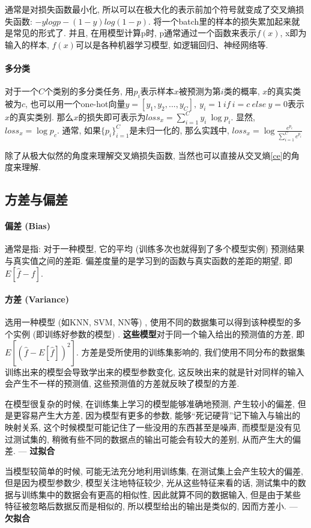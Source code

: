 通常是对损失函数最小化, 所以可以在极大化的表示前加个符号就变成了交叉熵损失函数: $- y log p - (1-y) log(1-p)$. 将一个batch里的样本的损失累加起来就是常见的形式了. 并且, 在用模型计算p时, p通常通过一个函数来表示$f(x)$, x即为输入的样本, $f(x)$可以是各种机器学习模型, 如逻辑回归、神经网络等. 


\paragraph{多分类}
对于一个$C$个类别的多分类任务, 用$p_i$表示样本$x$被预测为第$i$类的概率, $x$的真实类被为$c$, 也可以用一个one-hot向量$y = [y_1, y_2, ..., y_C],\ y_i = 1\ if\ i = c\ else\ y = 0$表示$x$的真实类别. 那么$x$的损失即可表示为$loss_x = \sum_{i=1}^C y_i\ \log p_i$. 显然, $loss_x = \log p_c$. 通常, 如果$\{p_i\}_{i=1}^C$是未归一化的, 那么实践中, $loss_x = \log \frac{e^{p_c}}{\sum_{i=1}^C e^{p_i}}$

除了从极大似然的角度来理解交叉熵损失函数, 当然也可以直接从交叉熵\ref{ce}的角度来理解. 

\subsection{方差与偏差}
\paragraph{偏差 (Bias) }通常是指: 对于一种模型, 它的平均 (训练多次也就得到了多个模型实例) 预测结果与真实值之间的差距. 偏差度量的是学习到的函数与真实函数的差距的期望, 即$E[\hat{f} - f]$. 

\paragraph{方差 (Variance) }选用一种模型 (如KNN, SVM, NN等) , 使用不同的数据集可以得到该种模型的多个实例 (即训练好参数的模型) . \textbf{这些模型}对于同一个输入给出的预测值的方差, 即$E[(\hat{f} - E[\hat{f}])^2]$. 方差是受所使用的训练集影响的, 我们使用不同分布的数据集训练出来的模型会导致学出来的模型参数变化, 这反映出来的就是针对同样的输入会产生不一样的预测值, 这些预测值的方差就反映了模型的方差. 

在模型很复杂的时候, 在训练集上学习的模型能够准确地预测, 产生较小的偏差, 但是更容易产生大方差, 因为模型有更多的参数, 能够“死记硬背”记下输入与输出的映射关系, 这个时候模型可能记住了一些没用的东西甚至是噪声, 而模型是没有见过测试集的, 稍微有些不同的数据点的输出可能会有较大的差别, 从而产生大的偏差.  --- \textbf{过拟合}

当模型较简单的时候, 可能无法充分地利用训练集, 在测试集上会产生较大的偏差, 但是因为模型参数少, 模型关注地特征较少, 光从这些特征来看的话, 测试集中的数据与训练集中的数据会有更高的相似性, 因此就算不同的数据输入, 但是由于某些特征被忽略后数据反而是相似的, 所以模型给出的输出是类似的, 因而方差小. --- \textbf{欠拟合}

